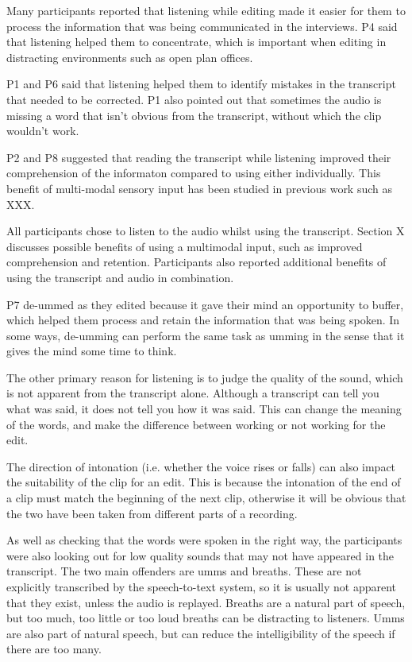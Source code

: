 
Many participants reported that listening while editing made it easier for them to process the information that was
being communicated in the interviews. P4 said that listening helped them to concentrate, which is important when
editing in distracting environments such as open plan offices.

P1 and P6 said that listening helped them to identify mistakes in the transcript that needed to be corrected. P1 also
pointed out that sometimes the audio is missing a word that isn't obvious from the transcript, without which the clip
wouldn't work.

P2 and P8 suggested that reading the transcript while listening improved their comprehension of the informaton compared
to using either individually. This benefit of multi-modal sensory input has been studied in previous work such as XXX.

All participants chose to listen to the audio whilst using the transcript. Section X discusses possible benefits of
using a multimodal input, such as improved comprehension and retention. Participants also reported additional benefits
of using the transcript and audio in combination.


P7 de-ummed as they edited because it gave their mind an opportunity to buffer, which helped them process and retain
the information that was being spoken. In some ways, de-umming can perform the same task as umming in the sense that it
gives the mind some time to think.


The other primary reason for listening is to judge the quality of the sound, which is not apparent from the transcript
alone. Although a transcript can tell you what was said, it does not tell you how it was said. This can change the
meaning of the words, and make the difference between working or not working for the edit.


The direction of intonation (i.e. whether the voice rises or falls) can also impact the suitability of the clip for an
edit. This is because the intonation of the end of a clip must match the beginning of the next clip, otherwise it will
be obvious that the two have been taken from different parts of a recording.


As well as checking that the words were spoken in the right way, the participants were also looking out for low quality
sounds that may not have appeared in the transcript. The two main offenders are umms and breaths. These are not
explicitly transcribed by the speech-to-text system, so it is usually not apparent that they exist, unless the audio is
replayed. Breaths are a natural part of speech, but too much, too little or too loud breaths can be distracting to
listeners. Umms are also part of natural speech, but can reduce the intelligibility of the speech if there are too
many.

